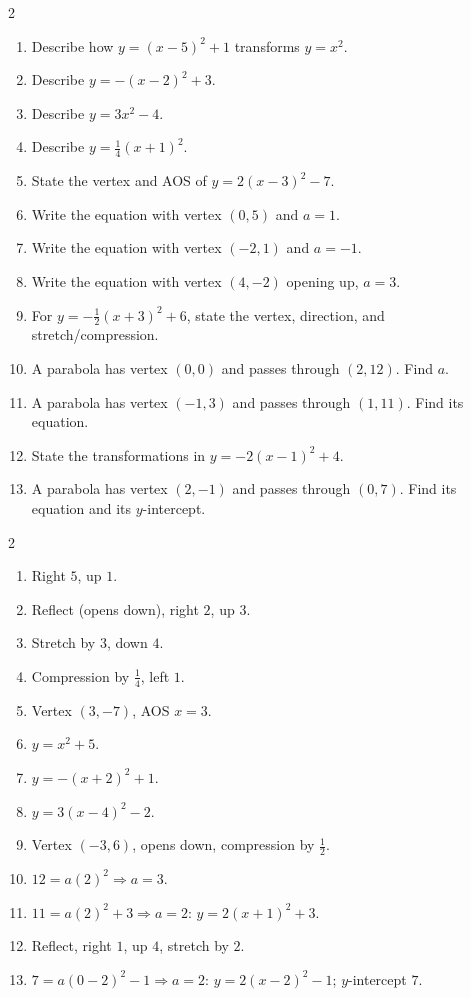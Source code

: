 \documentclass[11pt]{article}
\begin{document}
\begin{recapbox}
\begin{multicols}{2}
\small
\begin{enumerate}[leftmargin=*,itemsep=3pt]
  \item Describe how $y=(x-5)^2+1$ transforms $y=x^2$.
  \item Describe $y=-(x-2)^2+3$.
  \item Describe $y=3x^2-4$.
  \item Describe $y=\tfrac14(x+1)^2$.
  \item State the vertex and AOS of $y=2(x-3)^2-7$.
  \item Write the equation with vertex $(0,5)$ and $a=1$.
  \item Write the equation with vertex $(-2,1)$ and $a=-1$.
  \item Write the equation with vertex $(4,-2)$ opening up, $a=3$.
  \item For $y=-\tfrac12(x+3)^2+6$, state the vertex, direction, and stretch/compression.
  \item A parabola has vertex $(0,0)$ and passes through $(2,12)$. Find $a$.
  \item A parabola has vertex $(-1,3)$ and passes through $(1,11)$. Find its equation.
  \item State the transformations in $y=-2(x-1)^2+4$.
  \item A parabola has vertex $(2,-1)$ and passes through $(0,7)$. Find its equation and its $y$-intercept.
\end{enumerate}
\end{multicols}
\end{recapbox}

\begin{keybox}
\begin{multicols}{2}
\small
\begin{enumerate}[leftmargin=*,itemsep=3pt]
  \item Right $5$, up $1$.
  \item Reflect (opens down), right $2$, up $3$.
  \item Stretch by $3$, down $4$.
  \item Compression by $\tfrac14$, left $1$.
  \item Vertex $(3,-7)$, AOS $x=3$.
  \item $y=x^2+5$.
  \item $y=-(x+2)^2+1$.
  \item $y=3(x-4)^2-2$.
  \item Vertex $(-3,6)$, opens down, compression by $\tfrac12$.
  \item $12=a(2)^2\Rightarrow a=3$.
  \item $11=a(2)^2+3\Rightarrow a=2$: $y=2(x+1)^2+3$.
  \item Reflect, right $1$, up $4$, stretch by $2$.
  \item $7=a(0-2)^2-1\Rightarrow a=2$: $y=2(x-2)^2-1$; $y$-intercept $7$.
\end{enumerate}
\end{multicols}
\end{keybox}
\end{document}

